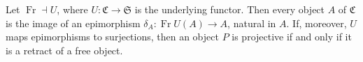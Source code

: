 Let $\operatorname{Fr} \dashv U$, where $U : \mathfrak{C} \to \mathfrak{S}$ is the underlying functor. Then every object $A$ of $\mathfrak{C}$ is the image of an epimorphism $\delta_A : \operatorname{Fr}U(A) \to A$, natural in $A$. If, moreover, $U$ maps epimorphisms to surjections, then an object $P$ is projective if and only if it is a retract of a free object.
